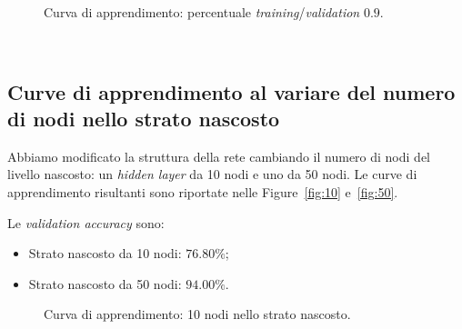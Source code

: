\documentclass[a4paper,12pt]{article}
\begin{document}
\begin{figure}[htb]
    \hspace*{-2.1cm}
    \caption{Curva di apprendimento: percentuale \emph{training}/\emph{validation} $0.9$.}
    \label{fig:09}
\end{figure}


\newpage ~ \newpage
\subsection{Curve di apprendimento al variare del numero di nodi nello strato nascosto}
Abbiamo modificato la struttura della rete cambiando il numero di nodi del livello nascosto: un \emph{hidden layer} da 10 nodi e uno da 50 nodi. Le curve di apprendimento risultanti sono riportate nelle Figure~\vref{fig:10} e~\vref{fig:50}.\medskip

Le \emph{validation accuracy} sono:
\begin{itemize}
    \item Strato nascosto da 10 nodi: $76.80\%$;
    \item Strato nascosto da 50 nodi: $94.00\%$.
\end{itemize}

\begin{figure}[htb]
    \hspace*{-2.1cm}
    \caption{Curva di apprendimento: 10 nodi nello strato nascosto.}
    \label{fig:10}
\end{figure}
\end{document}
